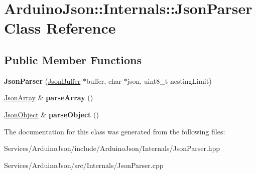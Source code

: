 \hypertarget{class_arduino_json_1_1_internals_1_1_json_parser}{}\section{Arduino\+Json\+:\+:Internals\+:\+:Json\+Parser Class Reference}
\label{class_arduino_json_1_1_internals_1_1_json_parser}
\subsection*{Public Member Functions}
\begin{DoxyCompactItemize}
\item 
\hypertarget{class_arduino_json_1_1_internals_1_1_json_parser_a0448df03d89dfcbc3da5475dc32cbd19}{}{\bfseries Json\+Parser} (\hyperlink{class_arduino_json_1_1_json_buffer}{Json\+Buffer} $\ast$buffer, char $\ast$json, uint8\+\_\+t nesting\+Limit)\label{class_arduino_json_1_1_internals_1_1_json_parser_a0448df03d89dfcbc3da5475dc32cbd19}

\item 
\hypertarget{class_arduino_json_1_1_internals_1_1_json_parser_af1a10a294c9fe885205b0819fd92dbaf}{}\hyperlink{class_arduino_json_1_1_json_array}{Json\+Array} \& {\bfseries parse\+Array} ()\label{class_arduino_json_1_1_internals_1_1_json_parser_af1a10a294c9fe885205b0819fd92dbaf}

\item 
\hypertarget{class_arduino_json_1_1_internals_1_1_json_parser_a575bd8cf8b23c8862ee77f0f171bf8fc}{}\hyperlink{class_arduino_json_1_1_json_object}{Json\+Object} \& {\bfseries parse\+Object} ()\label{class_arduino_json_1_1_internals_1_1_json_parser_a575bd8cf8b23c8862ee77f0f171bf8fc}

\end{DoxyCompactItemize}


The documentation for this class was generated from the following files\+:\begin{DoxyCompactItemize}
\item 
Services/\+Arduino\+Json/include/\+Arduino\+Json/\+Internals/Json\+Parser.\+hpp\item 
Services/\+Arduino\+Json/src/\+Internals/Json\+Parser.\+cpp\end{DoxyCompactItemize}

